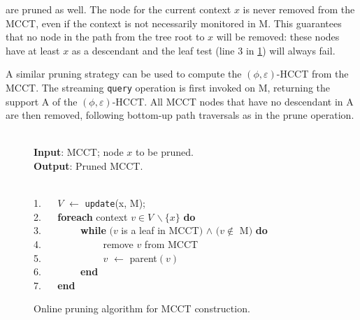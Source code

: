 \noindent
\fi
are pruned as well. The node for the current context $x$ is never removed from the MCCT, even if the context is not necessarily monitored in M. This guarantees that no node in the path from the tree root to $x$ will be removed: these nodes have at least $x$ as a descendant and the leaf test (line 3 in \myalgorithm\ref{alg:hcct-update}) will always fail. %

\noindent
A similar pruning strategy can be used to compute the $(\phi,\varepsilon)$-HCCT from the MCCT. The streaming {\tt query} operation is first invoked on M, returning the support A of the $(\phi,\varepsilon)$-HCCT. All MCCT nodes that have no descendant in A are then removed, following bottom-up path traversals as in the prune operation.

\ifx\noauthorea\undefined
\begin{figure}[ht]
\caption{\label{alg:hcct-update} Online pruning algorithm for MCCT construction.}
\begin{small}
\begin{minipage}{0.9\textwidth}
\hrulefill\\
\textbf{Input}: {MCCT; node $x$ to be pruned.}\\
\textbf{Output}: {Pruned MCCT.}

\vspace{-1mm}
\hrulefill\\
1. ~~ $V$ $\gets$ {\tt update}(x, M);\\
2. ~~ \textbf{foreach} context $v\in V\,\backslash \{x\}$ \textbf{do}\\
3. ~~ ~~~~ \textbf{while} $(v$ is a leaf in MCCT$)$ $\wedge$ $(v\not\in$ M$)$ \textbf{do}\\
4. ~~ ~~~~ ~~~~ remove $v$ from MCCT\\
5. ~~ ~~~~ ~~~~ $v$ $\gets$ parent$(v)$\\
6. ~~ ~~~~ \textbf{end}\\
7. ~~ \textbf{end}

\vspace{-1mm}
\hrulefill
\vspace{-2mm}
\end{minipage}
\end{small}
\end{figure}
\fi

\ifauthorea{\newline}{}
